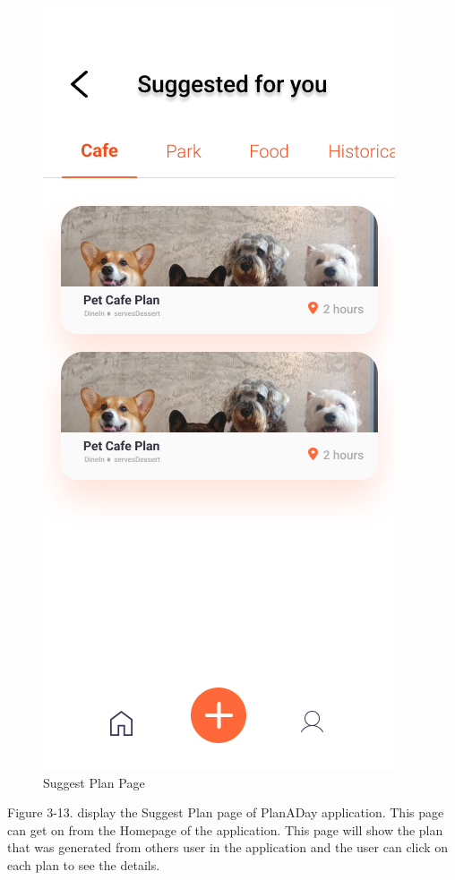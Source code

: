 \newpage
\begin{figure}[!h]
    \centering
    \includegraphics[width=0.5\linewidth]{chapter3/UI_Suggested_plan.png}
    \caption{Suggest Plan Page}
    \label{fig:Suggest Plan Page}
\end{figure}
\noindent
Figure 3-13. display the Suggest Plan page of PlanADay application. This page can
get on from the Homepage of the application. This page will show the plan that was
generated from others user in the application and the user can click on each plan to
see the details.

